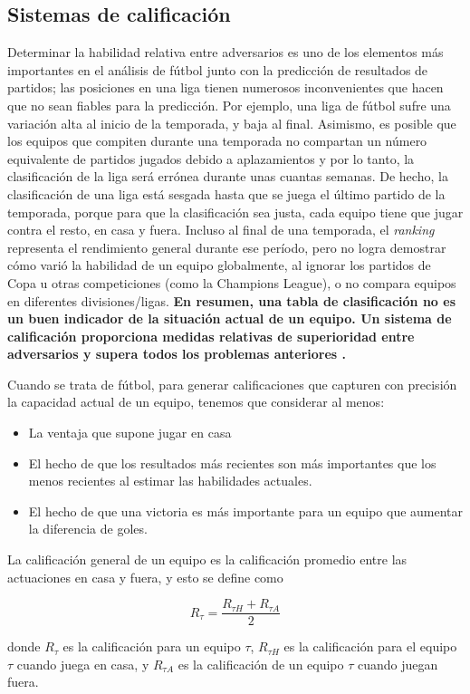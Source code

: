 \subsection{Sistemas de calificación} \label{subsect:ratings}
Determinar la habilidad relativa entre adversarios es uno de los elementos
más importantes en el análisis de fútbol junto con la predicción de resultados de partidos; las posiciones en 
una liga tienen numerosos inconvenientes que hacen que no sean fiables para la predicción. 
Por ejemplo, una liga de fútbol sufre una variación alta al inicio de la temporada, y baja 
al final. Asimismo, es posible que los equipos que compiten durante una temporada no
compartan un número equivalente de partidos jugados debido a aplazamientos y
por lo tanto, la clasificación de la liga será errónea durante unas cuantas semanas. De hecho, 
la clasificación de una liga está sesgada hasta que se juega el último partido de la temporada, porque
para que la clasificación sea justa, cada equipo tiene que jugar contra el resto, en
casa y fuera. Incluso al final de una temporada, el \textit{ranking} representa
el rendimiento general durante ese período, pero no logra
demostrar cómo varió la habilidad de un equipo globalmente, al
ignorar los partidos de Copa u otras competiciones (como la Champions
League), o no compara equipos en diferentes divisiones/ligas. \textbf{En
resumen, una tabla de clasificación no es un buen indicador de la situación actual de un equipo. Un 
sistema de calificación proporciona medidas relativas de superioridad entre adversarios y supera 
todos los problemas anteriores \cite{pi-ratings}.}

Cuando se trata de fútbol, para generar calificaciones que capturen con precisión la
capacidad actual de un equipo, tenemos que considerar al menos:
\begin{itemize}
    \item La ventaja que supone jugar en casa \cite{home-advantage}
    \item El hecho de que los resultados más recientes son más importantes que los menos recientes
    al estimar las habilidades actuales.
    \item El hecho de que una victoria es más importante para un equipo que aumentar la diferencia de goles.
\end{itemize}

\begin{definicion} \label{def:ratings}
La calificación general de un equipo es la calificación promedio entre las actuaciones 
en casa y fuera, y esto se define como

$$ R_{\tau}= \frac{R_{\tau H} + R_{\tau A}}{2} $$

donde $R_{\tau}$ es la calificación para un equipo $\tau$, $R_{\tau H}$ es la calificación para el 
equipo $\tau$ cuando juega en casa, y $R_{\tau A}$ es la calificación de un equipo $\tau$ cuando 
juegan fuera. 
\end{definicion}

